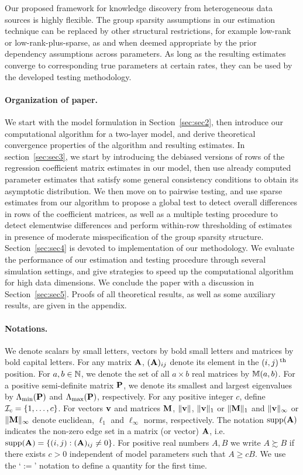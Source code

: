 Our proposed framework for knowledge discovery from heterogeneous data sources is highly flexible. The group sparsity assumptions in our estimation technique can be replaced by other structural restrictions, for example low-rank or low-rank-plus-sparse, as and when deemed appropriate by the prior dependency assumptions across parameters. As long as the resulting estimates converge to corresponding true parameters at certain rates, they can be used by the developed testing methodology.

\paragraph{Organization of paper.}
We start with the model formulation in Section~\ref{sec:sec2}, then introduce our computational algorithm for a two-layer model, and derive theoretical convergence properties of the algorithm and resulting estimates. In section~\ref{sec:sec3}, we start by introducing the debiased versions of rows of the regression coefficient matrix estimates in our model, then use already computed parameter estimates that satisfy some general consistency conditions to obtain its asymptotic distribution. We then move on to pairwise testing, and use sparse estimates from our algorithm to propose a global test to detect overall differences in rows of the coefficient matrices, as well as a multiple testing procedure to detect elementwise differences and perform within-row thresholding of estimates in presence of moderate misspecification of the group sparsity structure. Section~\ref{sec:sec4} is devoted to implementation of our methodology. We evaluate the performance of our estimation and testing procedure through several simulation settings, and give strategies to speed up the computational algorithm for high data dimensions.  We conclude the paper with a discussion in Section~\ref{sec:sec5}. Proofs of all theoretical results, as well as some auxiliary results, are given in the appendix.

\paragraph{Notations.}
We denote scalars by small letters, vectors by bold small letters and matrices by bold capital letters. For any matrix ${\mathbf{A}}$, $({\mathbf{A}})_{ij}$ denote its element in the $(i,j)\operatorname*{^{\text{th}}}$ position. For $a,b \in {\mathbb{N}}$, we denote the set of all $a \times b$ real matrices by ${\mathbb{M}}(a,b)$. For a positive semi-definite matrix ${\mathbf{P}}$, we denote its smallest and largest eigenvalues by $\Lambda_{\min} ({\mathbf{P}})$ and $\Lambda_{\max} ({\mathbf{P}})$, respectively. For any positive integer $c$, define ${\cal{I}}_c = \{ 1, \ldots, c\}$. For vectors ${\bf{v}}$ and matrices ${\mathbf{M}}$, $\| {\bf{v}} \|$, $\|{\bf{v}} \|_1$ or $\|{\mathbf{M}} \|_1$ and $\|{\bf{v}} \|_\infty$ or $\|{\mathbf{M}} \|_\infty$ denote euclidean, $\ell_1$ and $\ell_\infty$ norms, respectively. The notation $\operatorname*{supp}({\mathbf{A}})$ indicates the non-zero edge set in a matrix (or vector) ${\mathbf{A}}$, i.e. $\operatorname*{supp}({\mathbf{A}}) = \{(i,j): ({\mathbf{A}})_{ij} \neq 0\}$. For positive real numbers $A, B$ we write $A \succsim B$ if there exists $c>0$ independent of model parameters such that $A \geq cB$. We use the `$:=$' notation to define a quantity for the first time.